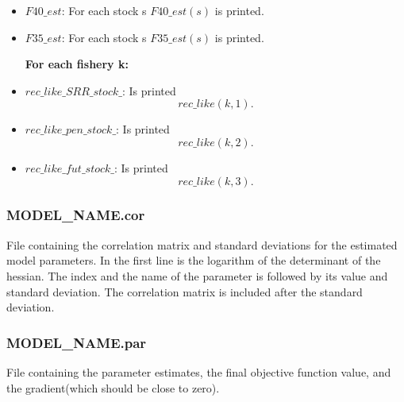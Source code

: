 \documentclass{article}
\begin{document}
\begin{itemize}
\item $F40\_est$: For each stock s $F40\_est(s)$ is printed.

\item $F35\_est$: For each stock s $F35\_est(s)$ is printed.

\textbf{For each fishery k:}

\item  $rec\_like\_SRR\_stock\_$: Is printed 
\begin{equation}
    rec\_like(k,1).
\end{equation}
\item $rec\_like\_pen\_stock\_$: Is printed
\begin{equation}
    rec\_like(k,2).
\end{equation}
\item $rec\_like\_fut\_stock\_$: Is printed
\begin{equation*}
    rec\_like(k,3).
\end{equation*}


\end{itemize}
    \subsubsection{MODEL\_NAME.cor} File containing the correlation matrix and standard deviations for the estimated model parameters.   In the first line is the logarithm of the determinant of the hessian. The index and the name of the parameter is followed by its value and standard deviation. The correlation matrix is included after the standard deviation.
    \subsubsection{MODEL\_NAME.par} File containing the parameter estimates, the final objective function value, and the gradient(which should be close to zero).
    
\end{document}
